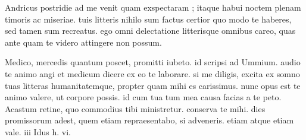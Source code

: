 


 Andricus postridie ad me venit quam exspectaram ; itaque habui noctem plenam timoris ac miseriae. tuis litteris nihilo sum factus certior quo modo te haberes, sed tamen sum recreatus. ego omni delectatione litterisque omnibus careo, quas ante quam te videro attingere non possum.

 Medico, mercedis quantum poscet, promitti iubeto. id scripsi ad Ummium. audio te animo angi et medicum dicere ex eo te laborare. si me diligis, excita ex somno tuas litteras humanitatemque, propter quam mihi es carissimus. nunc opus est te animo valere, ut corpore possis. id cum tua tum mea causa facias a te peto. Acastum retine, quo commodius tibi ministretur. conserva te mihi. dies promissorum adest, quem etiam repraesentabo, si adveneris. etiam atque etiam vale. iii Idus h. vi.
